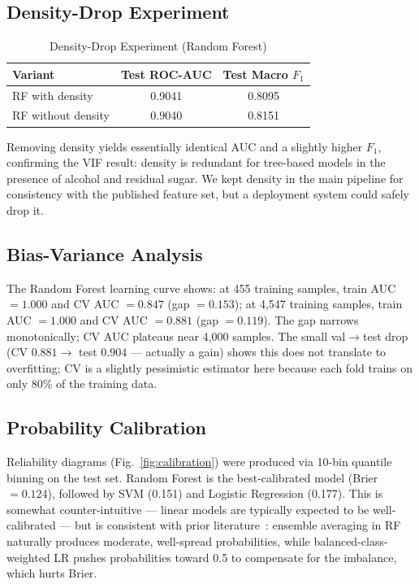 \documentclass[conference]{IEEEtran}
\begin{document}
\subsection{Density-Drop Experiment}
\label{sec:density}

\begin{table}[h]
\centering
\caption{Density-Drop Experiment (Random Forest)}
\label{tab:density}
\begin{tabular}{l c c}
\toprule
\textbf{Variant} & \textbf{Test ROC-AUC} & \textbf{Test Macro $F_1$} \\
\midrule
RF with density & 0.9041 & 0.8095 \\
RF without density & 0.9040 & 0.8151 \\
\bottomrule
\end{tabular}
\end{table}

Removing density yields essentially identical AUC and a slightly higher
$F_1$, confirming the VIF result: density is redundant for tree-based
models in the presence of alcohol and residual sugar. We kept density
in the main pipeline for consistency with the published feature set,
but a deployment system could safely drop it.

\subsection{Bias-Variance Analysis}

The Random Forest learning curve shows: at 455 training samples, train
AUC $= 1.000$ and CV AUC $= 0.847$ (gap $= 0.153$); at 4{,}547 training
samples, train AUC $= 1.000$ and CV AUC $= 0.881$ (gap $= 0.119$). The
gap narrows monotonically; CV AUC plateaus near 4{,}000 samples. The
small val$\to$test drop (CV $0.881 \to$ test $0.904$ --- actually a
gain) shows this does not translate to overfitting; CV is a slightly
pessimistic estimator here because each fold trains on only 80\% of the
training data.

\subsection{Probability Calibration}

Reliability diagrams (Fig.~\ref{fig:calibration}) were produced via
10-bin quantile binning on the test set. Random Forest is the
best-calibrated model (Brier $= 0.124$), followed by SVM (0.151) and
Logistic Regression (0.177). This is somewhat counter-intuitive ---
linear models are typically expected to be well-calibrated --- but is
consistent with prior literature~\cite{niculescu2005}: ensemble
averaging in RF naturally produces moderate, well-spread probabilities,
while balanced-class-weighted LR pushes probabilities toward 0.5 to
compensate for the imbalance, which hurts Brier.
\end{document}
